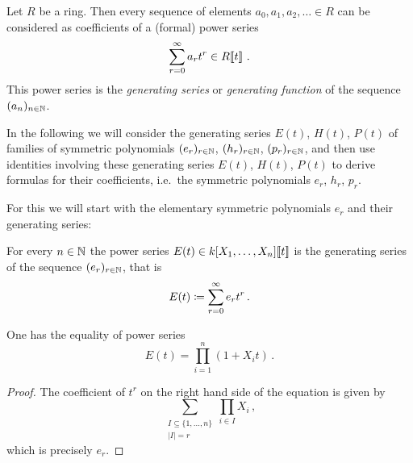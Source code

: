 \begin{fluff}
  Let $R$ be a ring.
  Then every sequence of elements $a_0, a_1, a_2, \dotsc \in R$ can be considered as coefficients of a (formal) power series
  \[
        \sum_{r=0}^\infty a_r t^r
    \in R\!\left[\!\left[t\right]\!\right] \,.
  \]
  This power series is the \emph{generating series} or \emph{generating function} of the sequence $(a_n)_{n \in \mathbb{N}}$.
  
  In the following we will consider the generating series $E(t)$, $H(t)$, $P(t)$ of families of symmetric polynomials $(e_r)_{r \in \mathbb{N}}$, $(h_r)_{r \in \mathbb{N}}$, $(p_r)_{r \in \mathbb{N}}$, and then use identities involving these generating series $E(t)$, $H(t)$, $P(t)$ to derive formulas for their coefficients, i.e.\ the symmetric polynomials $e_r$, $h_r$, $p_r$.
  
  For this we will start with the elementary symmetric polynomials $e_r$ and their generating series:
\end{fluff}


\begin{definition}
  For every $n \in \mathbb{N}$ the power series $E(t) \in k[X_1, \dotsc, X_n]\!\left[\!\left[t\right]\!\right]$ is the generating series of the sequence $(e_r)_{r \in \mathbb{N}}$, that is
  \[
              E(t)
    \coloneqq  \sum_{r=0}^\infty e_r t^r \,.
  \]
\end{definition}


\begin{lemma}
  \label{lemma: explicit formula for E}
  One has the equality of power series
  \[
      E(t)
    = \prod_{i=1}^n (1 + X_i t) \,.
  \]
\end{lemma}


\begin{proof}
  The coefficient of $t^r$ on the right hand side of the equation is given by
  \[
    \sum_{\substack{I \subseteq \{1, \dotsc, n\} \\ |I| = r}} \prod_{i \in I} X_i \,,
  \]
  which is precisely $e_r$.
\end{proof}


